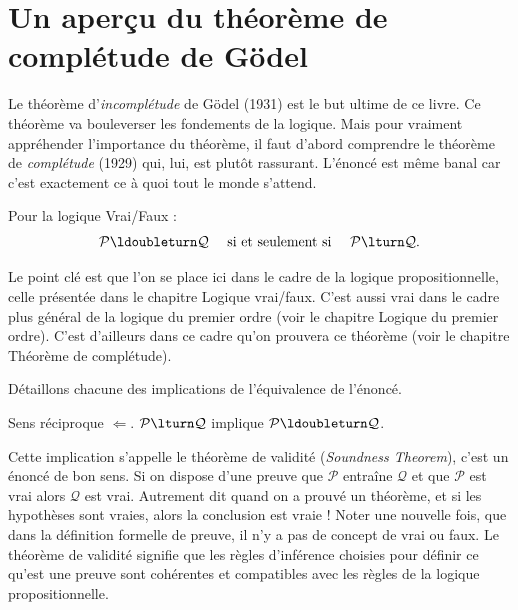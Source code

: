\documentclass[11pt,class=report,crop=false]{standalone}
\begin{document}
\section{Un aperçu du théorème de complétude de Gödel}

Le théorème d'\emph{incomplétude} de Gödel (1931) est le but ultime de ce livre. Ce théorème va bouleverser les fondements de la logique. Mais pour vraiment appréhender l'importance du théorème, il faut d'abord comprendre le théorème de \emph{complétude} (1929) qui, lui, est plutôt rassurant. L'énoncé est même banal car c'est exactement ce à quoi tout le monde s'attend.

\begin{theoreme}
	Pour la logique \og{}Vrai/Faux\fg{} :
	\[
	\mathcal{P} \ldoubleturn \mathcal{Q} \quad \text{ si et seulement si } \quad \mathcal{P} \lturn \mathcal{Q}.
	\]
\end{theoreme}

Le point clé est que l'on se place ici dans le cadre de la logique propositionnelle, celle présentée dans le chapitre \og{}Logique vrai/faux\fg{}.
C'est aussi vrai dans le cadre plus général de la logique du premier ordre (voir le chapitre \og{}Logique du premier ordre\fg{}). C'est d'ailleurs dans ce cadre qu'on prouvera ce théorème (voir le chapitre \og{}Théorème de complétude\fg{}).

Détaillons chacune des implications de l'équivalence de l'énoncé.

\bigskip

Sens réciproque $\Leftarrow$. $\mathcal{P} \lturn \mathcal{Q}$ implique $\mathcal{P} \ldoubleturn \mathcal{Q}$.

Cette implication s'appelle le \og{}théorème de validité\fg{} (\emph{Soundness Theorem}), c'est un énoncé de \og{}bon sens\fg{}. Si on dispose d'une preuve que $\mathcal{P}$ entraîne $\mathcal{Q}$ et que $\mathcal{P}$ est vrai alors $\mathcal{Q}$ est vrai. Autrement dit quand on a prouvé un théorème, et si les hypothèses sont vraies, alors la conclusion est vraie ! Noter une nouvelle fois, que dans la définition formelle de preuve, il n'y a pas de concept de vrai ou faux. Le théorème de validité signifie que les règles d'inférence choisies pour définir ce qu'est une preuve sont cohérentes et compatibles avec les règles de la logique propositionnelle.

\bigskip
\end{document}
